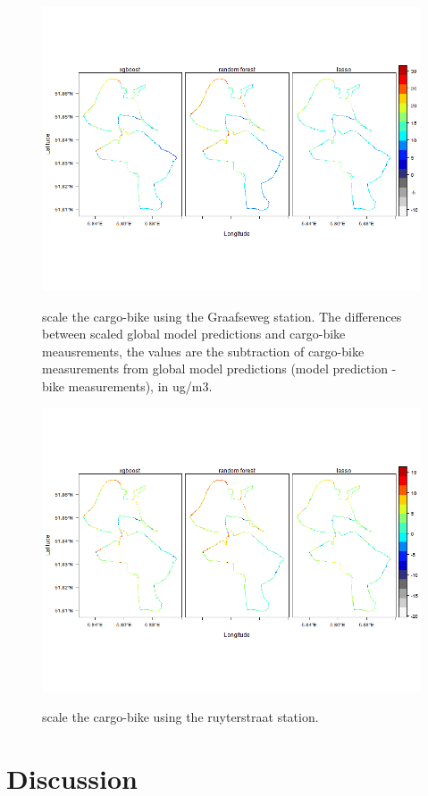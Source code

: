\documentclass{article}
\begin{document}
\begin{figure}[h!]
    \includegraphics[width=\linewidth]{f4a.png}
    \label{Graafseweg}
    \caption {scale the cargo-bike using the Graafseweg station. The differences between scaled global model predictions and cargo-bike meausrements, the values are the subtraction of cargo-bike measurements from global model predictions (model prediction - bike measurements), in ug/m3.}
\end{figure}
\begin{figure}[h!]
    \includegraphics[width=\linewidth]{f4b.png}
    \label{ruyterstraat}
    \caption {scale the cargo-bike using the ruyterstraat station.}
\end{figure}


\section{Discussion}
\end{document}
